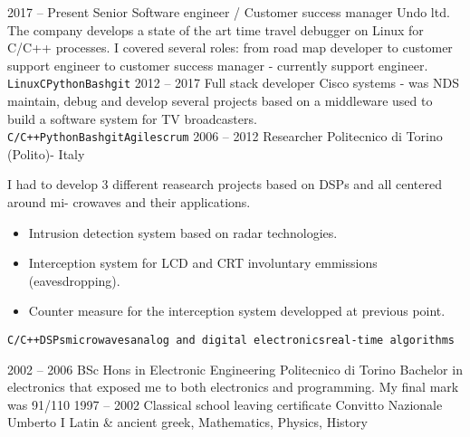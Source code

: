 \documentclass[8pt]{developercv} %
\begin{document}
\begin{entrylist}
	\entry
		{2017 -- Present}
		{Senior Software engineer / Customer success manager}
		{Undo ltd.}
		{The company develops a state of the art time travel debugger on Linux for C/C++ processes.
        I covered several roles: from road map developer to customer support engineer to customer
        success manager - currently support engineer.\\ \texttt{Linux}\slashsep\texttt{C}\slashsep\texttt{Python}\slashsep\texttt{Bash}\slashsep\texttt{git}}
	\entry
		{2012 -- 2017}
		{Full stack developer}
		{Cisco systems - was NDS}
		{maintain, debug and develop several projects based on a middleware used to build a software system for TV broadcasters.\\ \texttt{C/C++}\slashsep\texttt{Python}\slashsep\texttt{Bash}\slashsep\texttt{git}\slashsep\texttt{Agile}\slashsep\texttt{scrum}}
	\entry
		{2006 -- 2012}
		{Researcher}
		{Politecnico di Torino (Polito)- Italy}
		{I had to develop 3 different reasearch projects based on DSPs and all centered around mi-
crowaves and their applications.
\begin{itemize}
\item Intrusion detection system based on radar technologies.
\item Interception system for LCD and CRT involuntary emmissions (eavesdropping).
\item Counter measure for the interception system developped at previous point.
\end{itemize}
\texttt{C/C++}\slashsep\texttt{DSPs}\slashsep\texttt{microwaves}\slashsep\texttt{analog and digital electronics}\slashsep\texttt{real-time algorithms}}
\end{entrylist}



\begin{entrylist}
	\entry
		{2002 -- 2006}
		{BSc Hons in Electronic Engineering}
		{Politecnico di Torino}
		{Bachelor in electronics that exposed me to both electronics and programming. My final mark was 91/110}
	\entry
		{1997 -- 2002}
		{Classical school leaving certificate}
		{Convitto Nazionale Umberto I}
		{Latin \& ancient greek, Mathematics, Physics, History}
\end{entrylist}
\end{document}
